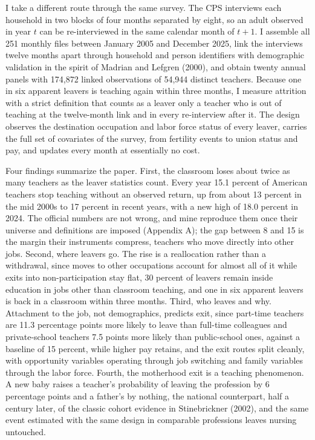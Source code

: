 \documentclass[11pt,a4paper]{article}
\begin{document}
I take a different route through the same survey. The CPS interviews each
household in two blocks of four months separated by eight, so an adult
observed in year $t$ can be re-interviewed in the same calendar month of
$t{+}1$. I assemble all 251 monthly files between January 2005 and
December 2025, link the interviews twelve months apart through household
and person identifiers with demographic validation in the spirit of
Madrian and Lefgren (2000), and obtain twenty annual panels with
174{,}872 linked observations of 54{,}944 distinct teachers. Because one in six apparent leavers is teaching
again within three months, I measure attrition with a strict definition
that counts as a leaver only a teacher who is out of teaching at the
twelve-month link and in every re-interview after it. The design observes
the destination occupation and labor force status of every leaver, carries
the full set of covariates of the survey, from fertility events to union
status and pay, and updates every month at essentially no cost.

Four findings summarize the paper. First, the classroom loses about
twice as many teachers as the leaver statistics count. Every year 15.1
percent of American teachers stop teaching without an observed return,
up from about 13 percent in the mid 2000s to 17 percent in recent years,
with a new high of 18.0 percent in 2024. The official numbers are not
wrong, and mine reproduce them once their universe and definitions are
imposed (Appendix A); the gap between 8 and 15 is the margin their
instruments compress, teachers who move directly into other jobs.
Second, where leavers go. The rise is a reallocation rather than a
withdrawal, since moves to other occupations account for almost all of
it while exits into non-participation stay flat, 30 percent of leavers
remain inside education in jobs other than classroom teaching, and one
in six apparent leavers is back in a classroom within three months.
Third, who leaves and why. Attachment to the job, not demographics,
predicts exit, since part-time teachers are 11.3 percentage points more
likely to leave than full-time colleagues and private-school teachers
7.5 points more likely than public-school ones, against a baseline of 15
percent, while higher pay retains, and the exit routes split cleanly,
with opportunity variables operating through job switching and family
variables through the labor force. Fourth, the motherhood exit is a
teaching phenomenon. A new baby raises a teacher's probability of
leaving the profession by 6 percentage points and a father's by nothing,
the national counterpart, half a century later, of the classic cohort
evidence in Stinebrickner (2002), and the same event estimated with the
same design in comparable professions leaves nursing untouched.
\end{document}
